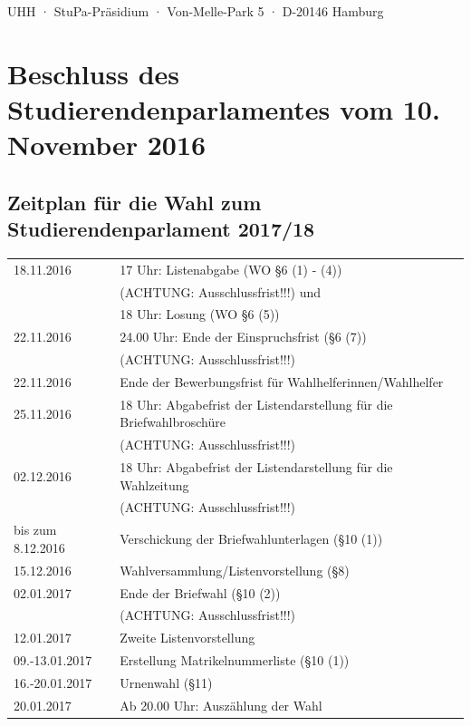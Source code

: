 \documentclass[ngerman,headheight=70pt]{scrartcl}
\begin{document}
    UHH · StuPa-Präsidium · Von-Melle-Park 5 · D-20146 Hamburg

    \section*{Beschluss des Studierendenparlamentes vom 10. November 2016}
    \subsection*{Zeitplan für die Wahl zum Studierendenparlament 2017/18}

    \begin{tabular}{ll}
        18.11.2016 & 17 Uhr: Listenabgabe (WO §6 (1) - (4)) \\
                    &(ACHTUNG: Ausschlussfrist!!!) und \\
                    & 18 Uhr: Losung (WO §6 (5)) \\
        22.11.2016 & 24.00 Uhr: Ende der Einspruchsfrist (§6 (7)) \\
                    &    (ACHTUNG: Ausschlussfrist!!!) \\
        22.11.2016 & Ende der Bewerbungsfrist für Wahlhelferinnen/Wahlhelfer \\
        25.11.2016 & 18 Uhr: Abgabefrist der Listendarstellung für die Briefwahlbroschüre \\
                 & (ACHTUNG: Ausschlussfrist!!!) \\
        02.12.2016 & 18 Uhr: Abgabefrist der Listendarstellung für die Wahlzeitung \\
                & (ACHTUNG: Ausschlussfrist!!!) \\
        bis zum 8.12.2016 & Verschickung der Briefwahlunterlagen (§10 (1)) \\
        15.12.2016 & Wahlversammlung/Listenvorstellung (§8) \\
        02.01.2017 & Ende der Briefwahl (§10 (2)) \\
                   & (ACHTUNG: Ausschlussfrist!!!)\\
        12.01.2017 & Zweite Listenvorstellung \\
        09.-13.01.2017 & Erstellung Matrikelnummerliste (§10 (1)) \\
        16.-20.01.2017 & Urnenwahl (§11) \\
        20.01.2017 & Ab 20.00 Uhr: Auszählung der Wahl
    \end{tabular}
\end{document}
